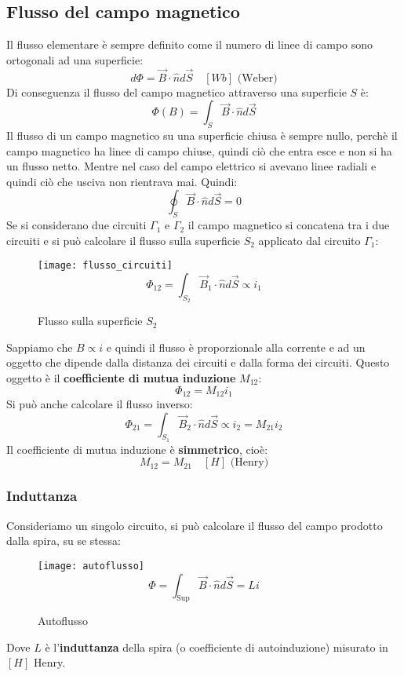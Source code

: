 \documentclass[a4paper]{article}
\begin{document}
\subsection{Flusso del campo magnetico}
Il flusso elementare è sempre definito come il numero di linee di campo sono ortogonali
ad una superficie:
\[
  d \Phi = \vec{B} \cdot \hat{n} d\vec{S} \quad \left[ Wb \right] \text{ (Weber)}
\] 
Di conseguenza il flusso del campo magnetico attraverso una superficie \( S \) è:
\[
  \Phi (B) = \int_S \vec{B} \cdot \hat{n} d\vec{S}
\] 
Il flusso di un campo magnetico su una superficie chiusa è sempre nullo, perchè il campo
magnetico ha linee di campo chiuse, quindi ciò che entra esce e non si ha un flusso netto.
Mentre nel caso del campo elettrico si avevano linee radiali e quindi ciò che usciva non
rientrava mai. Quindi:
\[
  \oint_{S} \vec{B} \cdot \hat{n} d\vec{S} = 0
\] 
Se si considerano due circuiti \( \Gamma_1 \) e \( \Gamma_2 \) il campo magnetico
si concatena tra i due circuiti e si può calcolare il flusso sulla superficie \( S_2 \) 
applicato dal circuito \( \Gamma_1 \):
\begin{figure}[H]
  \centering
  \texttt{[image: flusso\_circuiti]}
  \[
    \Phi_{12} = \int_{S_2} \vec{B}_1 \cdot \hat{n} d\vec{S} \propto i_1
  \] 
  \caption{Flusso sulla superficie \( S_2 \)}
\end{figure}
\noindent
Sappiamo che \( B \propto i \) e quindi il flusso è proporzionale alla corrente
e ad un oggetto che dipende dalla distanza dei circuiti e dalla forma dei circuiti.
Questo oggetto è il \textbf{coefficiente di mutua induzione} \( M_{12} \):
\[
  \Phi_{12} = M_{12} i_1
\] 
Si può anche calcolare il flusso inverso:
\[
  \Phi_{21} = \int_{S_1} \vec{B}_2 \cdot \hat{n} d\vec{S} \propto i_2 = M_{21} i_2
\] 
Il coefficiente di mutua induzione è \textbf{simmetrico}, cioè:
\[
  M_{12} = M_{21} \quad \left[ H \right] \text{ (Henry)}
\] 

\subsubsection{Induttanza}
Consideriamo un singolo circuito, si può calcolare il flusso del campo prodotto dalla
spira, su se stessa:
\begin{figure}[H]
  \centering
  \texttt{[image: autoflusso]}
  \[
    \Phi = \int_{\text{Sup}} \vec{B} \cdot \hat{n} d\vec{S} = Li
  \] 
  \caption{Autoflusso}
\end{figure}
\noindent
Dove \( L \) è l'\textbf{induttanza} della spira (o coefficiente di autoinduzione) misurato
in \( \left[ H \right] \) Henry.
\end{document}
